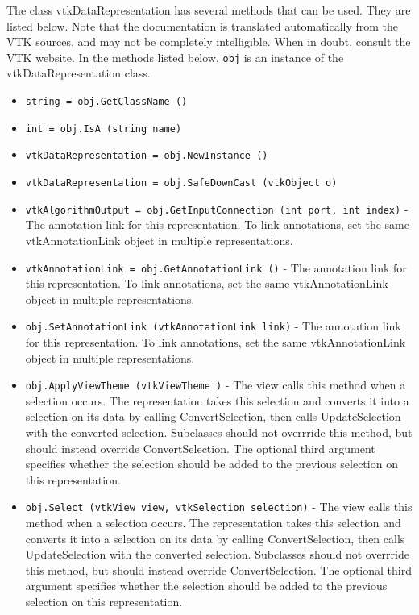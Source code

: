 The class vtkDataRepresentation has several methods that can be used.
  They are listed below.
Note that the documentation is translated automatically from the VTK sources,
and may not be completely intelligible.  When in doubt, consult the VTK website.
In the methods listed below, \verb|obj| is an instance of the vtkDataRepresentation class.
\begin{itemize}
\item  \verb|string = obj.GetClassName ()|

\item  \verb|int = obj.IsA (string name)|

\item  \verb|vtkDataRepresentation = obj.NewInstance ()|

\item  \verb|vtkDataRepresentation = obj.SafeDownCast (vtkObject o)|

\item  \verb|vtkAlgorithmOutput = obj.GetInputConnection (int port, int index)| -  The annotation link for this representation.
 To link annotations, set the same vtkAnnotationLink object in
 multiple representations.

\item  \verb|vtkAnnotationLink = obj.GetAnnotationLink ()| -  The annotation link for this representation.
 To link annotations, set the same vtkAnnotationLink object in
 multiple representations.

\item  \verb|obj.SetAnnotationLink (vtkAnnotationLink link)| -  The annotation link for this representation.
 To link annotations, set the same vtkAnnotationLink object in
 multiple representations.

\item  \verb|obj.ApplyViewTheme (vtkViewTheme )| -  The view calls this method when a selection occurs.
 The representation takes this selection and converts it into
 a selection on its data by calling ConvertSelection,
 then calls UpdateSelection with the converted selection.
 Subclasses should not overrride this method, but should instead
 override ConvertSelection.
 The optional third argument specifies whether the selection should be
 added to the previous selection on this representation.

\item  \verb|obj.Select (vtkView view, vtkSelection selection)| -  The view calls this method when a selection occurs.
 The representation takes this selection and converts it into
 a selection on its data by calling ConvertSelection,
 then calls UpdateSelection with the converted selection.
 Subclasses should not overrride this method, but should instead
 override ConvertSelection.
 The optional third argument specifies whether the selection should be
 added to the previous selection on this representation.


\end{itemize}

